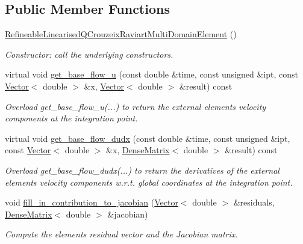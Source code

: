 \subsection*{Public Member Functions}
\begin{DoxyCompactItemize}
\item 
\hyperlink{classRefineableLinearisedQCrouzeixRaviartMultiDomainElement_aabc360f4d407c9dc644e0e4d4ec3e5cc}{Refineable\+Linearised\+Q\+Crouzeix\+Raviart\+Multi\+Domain\+Element} ()
\begin{DoxyCompactList}\small\item\em Constructor\+: call the underlying constructors. \end{DoxyCompactList}\item 
virtual void \hyperlink{classRefineableLinearisedQCrouzeixRaviartMultiDomainElement_a029e6ec7bfe31971e78cf0208bf8c3e9}{get\+\_\+base\+\_\+flow\+\_\+u} (const double \&time, const unsigned \&ipt, const \hyperlink{classoomph_1_1Vector}{Vector}$<$ double $>$ \&x, \hyperlink{classoomph_1_1Vector}{Vector}$<$ double $>$ \&result) const
\begin{DoxyCompactList}\small\item\em Overload get\+\_\+base\+\_\+flow\+\_\+u(...) to return the external element\textquotesingle{}s velocity components at the integration point. \end{DoxyCompactList}\item 
virtual void \hyperlink{classRefineableLinearisedQCrouzeixRaviartMultiDomainElement_ae30ee573668da667c4ee9bdadd47b905}{get\+\_\+base\+\_\+flow\+\_\+dudx} (const double \&time, const unsigned \&ipt, const \hyperlink{classoomph_1_1Vector}{Vector}$<$ double $>$ \&x, \hyperlink{classoomph_1_1DenseMatrix}{Dense\+Matrix}$<$ double $>$ \&result) const
\begin{DoxyCompactList}\small\item\em Overload get\+\_\+base\+\_\+flow\+\_\+dudx(...) to return the derivatives of the external element\textquotesingle{}s velocity components w.\+r.\+t. global coordinates at the integration point. \end{DoxyCompactList}\item 
void \hyperlink{classRefineableLinearisedQCrouzeixRaviartMultiDomainElement_a0ee5de787e1dfe477236eef98fc46092}{fill\+\_\+in\+\_\+contribution\+\_\+to\+\_\+jacobian} (\hyperlink{classoomph_1_1Vector}{Vector}$<$ double $>$ \&residuals, \hyperlink{classoomph_1_1DenseMatrix}{Dense\+Matrix}$<$ double $>$ \&jacobian)
\begin{DoxyCompactList}\small\item\em Compute the element\textquotesingle{}s residual vector and the Jacobian matrix. \end{DoxyCompactList}\end{DoxyCompactItemize}
